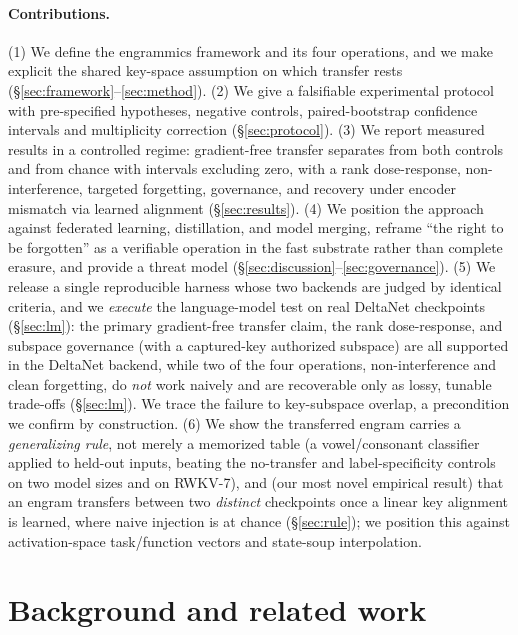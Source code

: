 \documentclass[11pt]{article}
\theoremstyle{definition}
\begin{document}
\paragraph{Contributions.}
(1) We define the engrammics framework and its four operations, and we make explicit the shared key-space assumption on which transfer rests (\S\ref{sec:framework}--\ref{sec:method}). (2) We give a falsifiable experimental protocol with pre-specified hypotheses, negative controls, paired-bootstrap confidence intervals and multiplicity correction (\S\ref{sec:protocol}). (3) We report measured results in a controlled regime: gradient-free transfer separates from both controls and from chance with intervals excluding zero, with a rank dose-response, non-interference, targeted forgetting, governance, and recovery under encoder mismatch via learned alignment (\S\ref{sec:results}). (4) We position the approach against federated learning, distillation, and model merging, reframe ``the right to be forgotten'' as a verifiable operation in the fast substrate rather than complete erasure, and provide a threat model (\S\ref{sec:discussion}--\ref{sec:governance}). (5) We release a single reproducible harness whose two backends are judged by identical criteria, and we \emph{execute} the language-model test on real DeltaNet checkpoints (\S\ref{sec:lm}): the primary gradient-free transfer claim, the rank dose-response, and subspace governance (with a captured-key authorized subspace) are all supported in the DeltaNet backend, while two of the four operations, non-interference and clean forgetting, do \emph{not} work naively and are recoverable only as lossy, tunable trade-offs (\S\ref{sec:lm}). We trace the failure to key-subspace overlap, a precondition we confirm by construction. (6) We show the transferred engram carries a \emph{generalizing rule}, not merely a memorized table (a vowel/consonant classifier applied to held-out inputs, beating the no-transfer and label-specificity controls on two model sizes and on RWKV-7), and (our most novel empirical result) that an engram transfers between two \emph{distinct} checkpoints once a linear key alignment is learned, where naive injection is at chance (\S\ref{sec:rule}); we position this against activation-space task/function vectors and state-soup interpolation.

\section{Background and related work}
\end{document}
